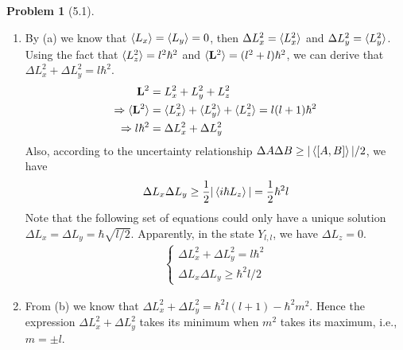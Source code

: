 \documentclass[twoside,11pt]{article}
\theoremstyle{definition}
\newtheorem{problem}{Problem}
\theoremstyle{remark}
\begin{document}
\begin{problem}[5.1]
\begin{enumerate}[label=(\alph*)]
    \item By (a) we know that $\braket{L_x} = \braket{L_y}=0$, then $\Delta L_x^2 = \braket{L_x^2}$ 
    and $\Delta L_y^2 = \braket{L_y^2}$.
    Using the fact that $\braket{L_z^2} = l^2\hbar^2$ and $\braket{\mathbf{L}^2}=(l^2+l)\hbar^2$, we can derive that
    $\Delta L_x^2 + \Delta L_y^2=l\hbar^2$.
    \begin{align*}
        \mathbf{L}^2 &= L_x^2 + L_y^2 + L_z^2\\
        \Rightarrow
        \braket{\mathbf{L}^2} &= \braket{L_x^2} + \braket{L_y^2} + \braket{L_z^2} = l(l+1)\hbar^2  \\
        \Rightarrow l\hbar^2 &= \Delta L_x^2 + \Delta L_y^2
    \end{align*}
    Also, according to the uncertainty relationship $\Delta A\Delta B\geq |\braket{[A,B]}|/2$, we have
    \begin{align*}
        \Delta L_x\Delta L_y \geq \frac{1}{2} |\braket{i\hbar L_z}| = \frac{1}{2}\hbar^2l
    \end{align*}
    Note that the following set of equations could only have a unique solution
    $\Delta L_x=\Delta L_y=\hbar\sqrt{l/2}$.
    Apparently, in the state $Y_{l,l}$, we have $\Delta L_z = 0$.
    \begin{align*}
        \begin{cases}
            \Delta L_x^2 + \Delta L_y^2 = l\hbar^2\\
            \Delta L_x\Delta L_y \geq \hbar^2 l/2
        \end{cases}
    \end{align*}

    \item From (b) we know that $\Delta L_x^2 + \Delta L_y^2 = \hbar^2l(l+1) - \hbar^2m^2$.
    Hence the expression $\Delta L_x^2 + \Delta L_y^2$ takes its minimum when $m^2$ takes
    its maximum, i.e., $m=\pm l$.


\end{enumerate}
\end{problem}
\end{document}
